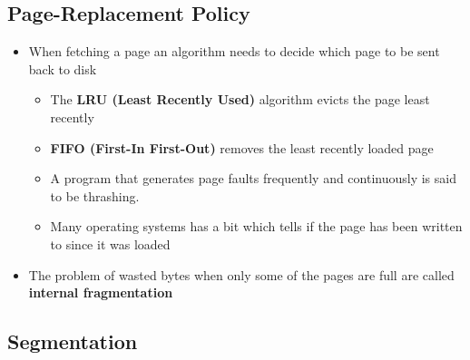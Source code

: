 \documentclass[11pt]{article}
\providecommand{\tightlist}{%
      \setlength{\itemsep}{0pt}\setlength{\parskip}{0pt}}
\begin{document}
    \subsection{Page-Replacement Policy}\label{page-replacement-policy}

\begin{itemize}
\tightlist
\item
  When fetching a page an algorithm needs to decide which page to be
  sent back to disk

  \begin{itemize}
  \tightlist
  \item
    The \textbf{LRU (Least Recently Used)} algorithm evicts the page
    least recently
  \item
    \textbf{FIFO (First-In First-Out)} removes the least recently loaded
    page
  \item
    A program that generates page faults frequently and continuously is
    said to be thrashing.
  \item
    Many operating systems has a bit which tells if the page has been
    written to since it was loaded
  \end{itemize}
\item
  The problem of wasted bytes when only some of the pages are full are
  called \textbf{internal fragmentation}
\end{itemize}

    \subsection{Segmentation}\label{segmentation}
\end{document}
